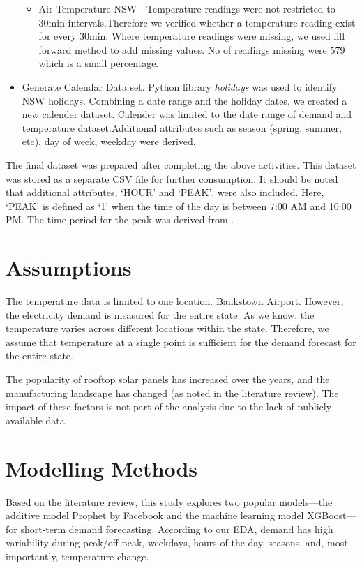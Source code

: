 \documentclass[mstat,12pt]{unswthesis}
\begin{document}
\begin{itemize}
\begin{itemize}
      \item Air Temperature NSW - Temperature readings were not restricted to 30min intervals.Therefore we verified whether a temperature reading exist for every 30min. Where temperature readings were missing, we used fill forward method to add missing values. No of readings missing were 579 which is a small percentage.
    \end{itemize}
  \item Generate Calendar Data set. Python library \textit{holidays} was used to identify NSW holidays. Combining a date range and the holiday dates, we created a new calender dataset. Calender was limited to the date range of demand and temperature dataset.Additional attributes such as season (spring, summer, etc), day of week, weekday were derived.
\end{itemize}

The final dataset was prepared after completing the above activities.
This dataset was stored as a separate CSV file for further consumption.
It should be noted that additional attributes, `HOUR' and `PEAK', were
also included. Here, `PEAK' is defined as `1' when the time of the day
is between 7:00 AM and 10:00 PM. The time period for the peak was
derived from \cite{canstarblue_peakoffpeak}.

\section{Assumptions}\label{assumptions}

The temperature data is limited to one location. Bankstown Airport.
However, the electricity demand is measured for the entire state. As we
know, the temperature varies across different locations within the
state. Therefore, we assume that temperature at a single point is
sufficient for the demand forecast for the entire state.

The popularity of rooftop solar panels has increased over the years, and
the manufacturing landscape has changed (as noted in the literature
review). The impact of these factors is not part of the analysis due to
the lack of publicly available data.

\section{Modelling Methods}\label{modelling-methods}

Based on the literature review, this study explores two popular
models---the additive model Prophet by Facebook and the machine learning
model XGBoost---for short-term demand forecasting. According to our EDA,
demand has high variability during peak/off-peak, weekdays, hours of the
day, seasons, and, most importantly, temperature change.
\end{document}
